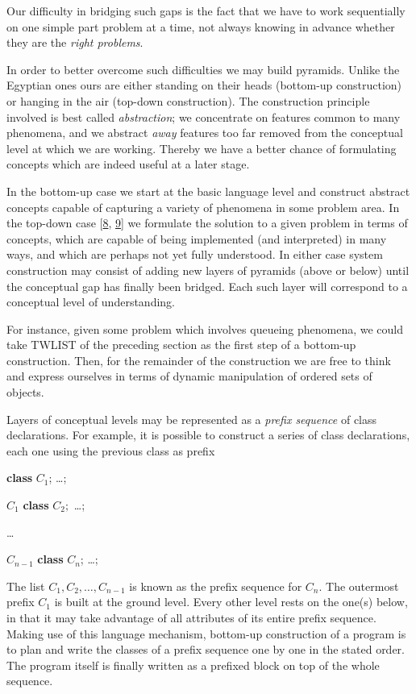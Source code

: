Our difficulty in bridging such gaps is the fact that we have to work sequentially on one simple part problem at a time, not always knowing in advance whether they are the \textit{right problems}.

In order to better overcome such difficulties we may build pyramids. Unlike the Egyptian ones ours are either standing on their heads (bottom-up construction) or hanging in the air (top-down construction). The construction principle involved is best called \textit{abstraction}; we concentrate on features common to many phenomena, and we abstract \textit{away} features too far removed from the conceptual level at which we are working. Thereby we have a better chance of formulating concepts which are indeed useful at a later stage.

In the bottom-up case we start at the basic language level and construct abstract concepts capable of capturing a variety of phenomena in some problem area. In the top-down case [\hyperref[ref:8]{8}, \hyperref[ref:9]{9}] we formulate the solution to a given problem in terms of concepts, which are capable of being implemented (and interpreted) in many ways, and which are perhaps not yet fully understood. In either case system construction may consist of adding new layers of pyramids (above or below) until the conceptual gap has finally been bridged. Each such layer will correspond to a conceptual level of understanding.

For instance, given some problem which involves queueing phenomena, we could take TWLIST of the preceding section as the first step of a bottom-up construction. Then, for the remainder of the construction we are free to think and express ourselves in terms of dynamic manipulation of ordered sets of 
objects.

Layers of conceptual levels may be represented as a \textit{prefix sequence} of class declarations. For example, it is possible to construct a series of class declarations, each one using the previous class as prefix

\hfill\textbf{class} $C_1$; \dots;\hspace{14em}

\hfill $C_1$ \textbf{class} $C_2;$ \dots;\hspace{14em}

\tabto*{13em}\dots

\hfill $C_{n - 1}$ \textbf{class} $C_n$; \dots;\hspace{14em}

\noindent
The list $C_1, C_2, \dots, C_{n-1}$ is known as the prefix sequence for $C_n$. The outermost prefix $C_1$ is built at the ground level. Every other level rests on the one(s) below, in that it may take advantage of all attributes of its entire prefix sequence. Making use of this language mechanism, bottom-up construction of a program is to plan and write the classes of a prefix sequence one by one in the stated order. The program itself is finally written as a prefixed block on top of the whole sequence.

